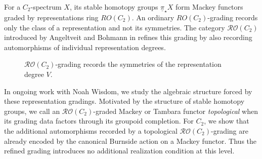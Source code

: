 \documentclass[11pt]{article}
\begin{document}
For a $C_2$-spectrum $X$, its stable homotopy groups $\underline{\pi}_\star X$ form Mackey functors graded by representations ring $RO(C_2)$.
An ordinary $RO(C_2)$-grading records only the class of a representation and not its symmetries.
The category $\mathcal{RO}(C_2)$ introduced by Angeltveit and Bohmann in \cite{AngeltveitBohmann} refines this grading by also recording automorphisms of individual representation degrees.

\begin{figure}[h]
\centering
{}

\captionsetup{font=footnotesize}
\caption{
$\mathcal{RO}(C_2)$-grading records the symmetries of the representation degree $V$.
}
\label{fig:RO-grading}
\end{figure}

In ongoing work with Noah Wisdom, we study the algebraic structure forced by these representation gradings.
Motivated by the structure of stable homotopy groups, we call an $\mathcal{RO}(C_2)$-graded Mackey or Tambara functor \emph{topological} when its grading data factors through its groupoid completion.
For $C_2$, we show that the additional automorphisms recorded by a topological $\mathcal{RO}(C_2)$-grading are already encoded by the canonical Burnside action on a Mackey functor.
Thus the refined grading introduces no additional realization condition at this level.
\end{document}
